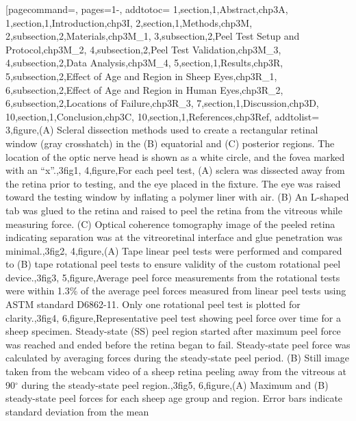 \documentclass[../../Dissertation]{subfiles}
\begin{document}
[pagecommand={},
pages={1-},
addtotoc={
    1,section,1,Abstract,chp3A,   
    1,section,1,Introduction,chp3I,   
    2,section,1,Methods,chp3M,   
    2,subsection,2,Materials,chp3M_1,   
    3,subsection,2,Peel Test Setup and Protocol,chp3M_2,   
    4,subsection,2,Peel Test Validation,chp3M_3,   
    4,subsection,2,Data Analysis,chp3M_4,   
    5,section,1,Results,chp3R,   
    5,subsection,2,Effect of Age and Region in Sheep Eyes,chp3R_1,   
    6,subsection,2,Effect of Age and Region in Human Eyes,chp3R_2,   
    6,subsection,2,Locations of Failure,chp3R_3,   
    7,section,1,Discussion,chp3D,   
    10,section,1,Conclusion,chp3C,   
    10,section,1,References,chp3Ref},   
addtolist={
    3,figure,{(A) Scleral dissection methods used to create a rectangular
        retinal window (gray crosshatch) in the (B) equatorial and (C)
        posterior regions. The location of the optic nerve head is shown as a
        white circle, and the fovea marked with an ``x''.},3fig1,   
    4,figure,{For each peel test, (A) sclera was dissected away from the
        retina prior to testing, and the eye placed in the fixture. The eye was
        raised toward the testing window by inflating a polymer liner with air.
        (B) An L-shaped tab was glued to the retina and raised to peel the
        retina from the vitreous while measuring force. (C) Optical coherence
        tomography image of the peeled retina indicating separation was at the
        vitreoretinal interface and glue penetration was minimal.},3fig2,   
    4,figure,{(A) Tape linear peel tests were performed and compared to (B)
        tape rotational peel tests to ensure validity of the custom rotational
        peel device.},3fig3,   
    5,figure,{Average peel force measurements from the rotational tests were
        within 1.3\% of the average peel forces measured from linear peel tests
        using ASTM standard D6862-11. Only one rotational peel test is plotted
        for clarity.},3fig4,   
    6,figure,{Representative peel test showing peel force over time for a
        sheep specimen. Steady-state (SS) peel region started after maximum
        peel force was reached and ended before the retina began to fail.
        Steady-state peel force was calculated by averaging forces during the
        steady-state peel period. (B) Still image taken from the webcam video
        of a sheep retina peeling away from the vitreous at 90$^\circ$ during
        the steady-state peel region.},3fig5,   
    6,figure,{(A) Maximum and (B) steady-state peel forces for each sheep age
        group and region. Error bars indicate standard deviation from the mean
}}
\end{document}
